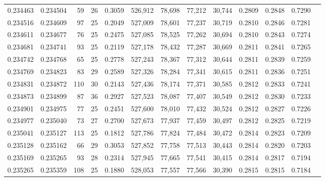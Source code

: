 \begin{tabular}{rrrrrrrrrrrrr}
0.234463 & 0.234504 &  59 &  26 &                                     0.3059 & 526,912 &  78,698 &  77,212 &  30,744 & 0.2809 & 0.2848 & 0.7290 \\
0.234516 & 0.234609 &  97 &  25 &                                     0.2049 & 527,009 &  78,601 &  77,237 &  30,719 & 0.2810 & 0.2846 & 0.7281 \\
0.234611 & 0.234677 &  76 &  25 &                                     0.2475 & 527,085 &  78,525 &  77,262 &  30,694 & 0.2810 & 0.2843 & 0.7274 \\
0.234681 & 0.234741 &  93 &  25 &                                     0.2119 & 527,178 &  78,432 &  77,287 &  30,669 & 0.2811 & 0.2841 & 0.7265 \\
0.234742 & 0.234768 &  65 &  25 &                                     0.2778 & 527,243 &  78,367 &  77,312 &  30,644 & 0.2811 & 0.2839 & 0.7259 \\
0.234769 & 0.234823 &  83 &  29 &                                     0.2589 & 527,326 &  78,284 &  77,341 &  30,615 & 0.2811 & 0.2836 & 0.7251 \\
0.234831 & 0.234872 & 110 &  30 &                                     0.2143 & 527,436 &  78,174 &  77,371 &  30,585 & 0.2812 & 0.2833 & 0.7241 \\
0.234873 & 0.234899 &  87 &  36 &                                     0.2927 & 527,523 &  78,087 &  77,407 &  30,549 & 0.2812 & 0.2830 & 0.7233 \\
0.234901 & 0.234975 &  77 &  25 &                                     0.2451 & 527,600 &  78,010 &  77,432 &  30,524 & 0.2812 & 0.2827 & 0.7226 \\
0.234977 & 0.235040 &  73 &  27 &                                     0.2700 & 527,673 &  77,937 &  77,459 &  30,497 & 0.2812 & 0.2825 & 0.7219 \\
0.235041 & 0.235127 & 113 &  25 &                                     0.1812 & 527,786 &  77,824 &  77,484 &  30,472 & 0.2814 & 0.2823 & 0.7209 \\
0.235128 & 0.235162 &  66 &  29 &                                     0.3053 & 527,852 &  77,758 &  77,513 &  30,443 & 0.2814 & 0.2820 & 0.7203 \\
0.235169 & 0.235265 &  93 &  28 &                                     0.2314 & 527,945 &  77,665 &  77,541 &  30,415 & 0.2814 & 0.2817 & 0.7194 \\
0.235265 & 0.235359 & 108 &  25 &                                     0.1880 & 528,053 &  77,557 &  77,566 &  30,390 & 0.2815 & 0.2815 & 0.7184 \\

\end{tabular}
